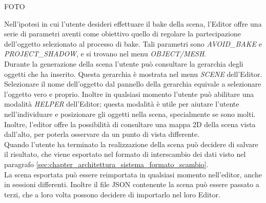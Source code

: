FOTO


Nell’ipotesi in cui l’utente desideri effettuare il bake della scena, l’Editor offre una serie di parametri aventi come obiettivo quello di regolare la partecipazione dell’oggetto selezionato al processo di bake. Tali parametri sono \emph{AVOID\_BAKE} e \emph{PROJECT\_SHADOW}, e si trovano nel menu \emph{OBJECT/MESH}.
\\
Durante la generazione della scena l’utente può consultare la gerarchia degli oggetti che ha inserito. Questa gerarchia è mostrata nel menu \emph{SCENE} dell’Editor. 
\\
Selezionare il nome dell’oggetto dal pannello della gerarchia equivale a selezionare l’oggetto vero e proprio. 
Inoltre in qualsiasi momento l’utente può abilitare una modalità \emph{HELPER} dell’Editor; questa modalità è utile per aiutare l’utente nell’individuare e posizionare gli oggetti nella scena, specialmente se sono molti.
Inoltre, l’editor offre la possibilità di consultare una mappa 2D della scena vista dall’alto, per poterla osservare da un punto di vista differente.
\\
Quando l’utente ha terminato la realizzazione della scena può decidere di salvare il risultato, che viene esportato nel formato di interscambio dei dati visto nel paragrafo \ref{sec:chapter_architettura_sistema_formato_scambio}.
\\
La scena esportata può essere reimportata in qualsiasi momento nell’editor, anche in sessioni differenti. Inoltre il file JSON contenente la scena può essere passato a terzi, che a loro volta possono decidere di importarlo nel loro Editor.
